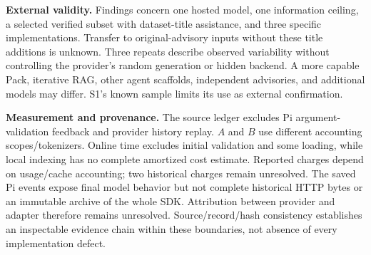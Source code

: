 \textbf{External validity.} Findings concern one hosted model, one information ceiling, a selected verified subset with dataset-title assistance, and three specific implementations. Transfer to original-advisory inputs without these title additions is unknown. Three repeats describe observed variability without controlling the provider's random generation or hidden backend. A more capable Pack, iterative RAG, other agent scaffolds, independent advisories, and additional models may differ. S1's known sample limits its use as external confirmation.

\textbf{Measurement and provenance.} The source ledger excludes Pi argument-validation feedback and provider history replay. $A$ and $B$ use different accounting scopes/tokenizers. Online time excludes initial validation and some loading, while local indexing has no complete amortized cost estimate. Reported charges depend on usage/cache accounting; two historical charges remain unresolved. The saved Pi events expose final model behavior but not complete historical HTTP bytes or an immutable archive of the whole SDK. Attribution between provider and adapter therefore remains unresolved. Source/record/hash consistency establishes an inspectable evidence chain within these boundaries, not absence of every implementation defect.
